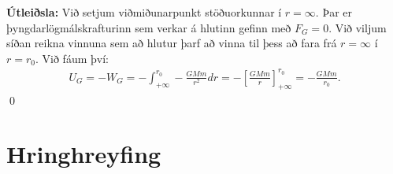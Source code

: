 \ifdefined \wholebook \else\documentclass[oneside]{book}\usepackage{EdlBook}\graphicspath{{figures/}}
\begin{document}
\textbf{Útleiðsla:} Við setjum viðmiðunarpunkt stöðuorkunnar í $r = \infty$. Þar er þyngdarlögmálskrafturinn sem verkar á hlutinn gefinn með $F_G = 0$. Við viljum síðan reikna vinnuna sem að hlutur þarf að vinna til þess að fara frá $r = \infty$ í $r = r_0$. Við fáum því:
\begin{align*}
    U_G = -W_G = - \int_{+\infty}^{r_0} -\frac{GMm}{r^2} dr = -\left[  \frac{GMm}{r} \right]_{+\infty}^{r_0} = -\frac{GMm}{r_0}.
\end{align*}
\qed

\section{Hringhreyfing}
\end{document}

